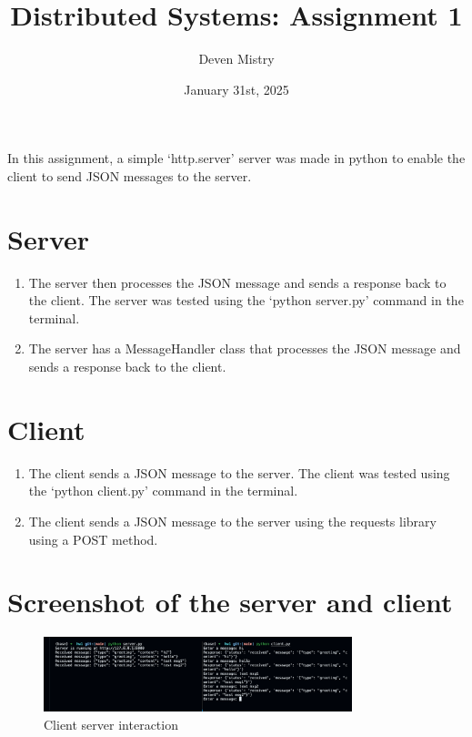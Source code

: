 \documentclass{article}
\title{Distributed Systems: Assignment 1}
\author{Deven Mistry}
\date{January 31st, 2025}
\begin{document}
\maketitle

In this assignment, a simple `http.server' server was made in python to enable the client to send JSON messages to the server.

\section*{Server}

\begin{enumerate}
    \item The server then processes the JSON message and sends a response back to the client. The server was tested using the `python server.py' command in the terminal.
    \item The server has a MessageHandler class that processes the JSON message and sends a response back to the client.
\end{enumerate}

\section*{Client}

\begin{enumerate}
    \item The client sends a JSON message to the server. The client was tested using the `python client.py' command in the terminal.
    \item The client sends a JSON message to the server using the requests library using a POST method.
\end{enumerate}

\section*{Screenshot of the server and client}

\begin{figure}[h]
    \centering
    \includegraphics[width=0.8\textwidth]{image.png}
    \caption{Client server interaction}
\end{figure}
\end{document}
